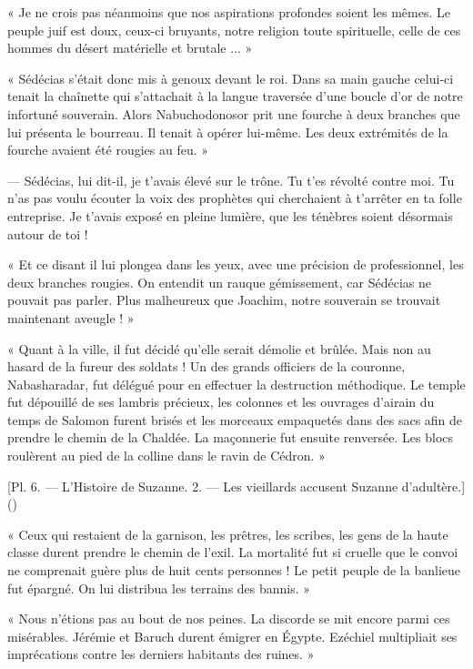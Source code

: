 \documentclass[a4paper, 11pt, oneside, polutonikogreek, french]{article}
\begin{document}
« Je ne crois pas néanmoins que nos aspirations profondes soient les mêmes. Le peuple juif est doux, ceux-ci bruyants, notre religion toute spirituelle, celle de ces hommes du désert matérielle et brutale ... »

« Sédécias s'était donc mis à genoux devant le roi. Dans sa main gauche celui-ci tenait la chaînette qui s'attachait à la langue traversée d'une boucle d'or de notre infortuné souverain. Alors Nabuchodonosor prit une fourche à deux branches que lui présenta le bourreau. Il tenait à opérer lui-même. Les deux extrémités de la fourche avaient été rougies au feu. »

--- Sédécias, lui dit-il, je t'avais élevé sur le trône. Tu t'es révolté contre moi. Tu n'as pas voulu écouter la voix des prophètes qui cherchaient à t'arrêter en ta folle entreprise. Je t'avais exposé en pleine lumière, que les ténèbres soient désormais autour de toi !

« Et ce disant il lui plongea dans les yeux, avec une précision de professionnel, les deux branches rougies. On entendit un rauque gémissement, car Sédécias ne pouvait pas parler. Plus malheureux que Joachim, notre souverain se trouvait maintenant aveugle ! »

\bigskip
\centerline{\EightStarTaper}
\centerline{\EightStarTaper\EightStarTaper}
\bigskip

« Quant à la ville, il fut décidé qu'elle serait démolie et brûlée. Mais non au hasard de la fureur des soldats ! Un des grands officiers de la couronne, Nabasharadar, fut délégué pour en effectuer la destruction méthodique. Le temple fut dépouillé de ses lambris précieux, les colonnes et les ouvrages d'airain du temps de Salomon furent brisés et les morceaux empaquetés dans des sacs afin de prendre le chemin de la Chaldée. La maçonnerie fut ensuite renversée. Les blocs roulèrent au pied de la colline dans le ravin de Cédron. »

[Pl. 6. --- L'Histoire de Suzanne. 2. --- Les vieillards accusent Suzanne d'adultère.]()

« Ceux qui restaient de la garnison, les prêtres, les scribes, les gens de la haute classe durent prendre le chemin de l'exil. La mortalité fut si cruelle que le convoi ne comprenait guère plus de huit cents personnes ! Le petit peuple de la banlieue fut épargné. On lui distribua les terrains des bannis. »

\bigskip
\centerline{\EightStarTaper}
\centerline{\EightStarTaper\EightStarTaper}
\bigskip

« Nous n'étions pas au bout de nos peines. La discorde se mit encore parmi ces misérables. Jérémie et Baruch durent émigrer en Égypte. Ezéchiel multipliait ses imprécations contre les derniers habitants des ruines. »
\end{document}

